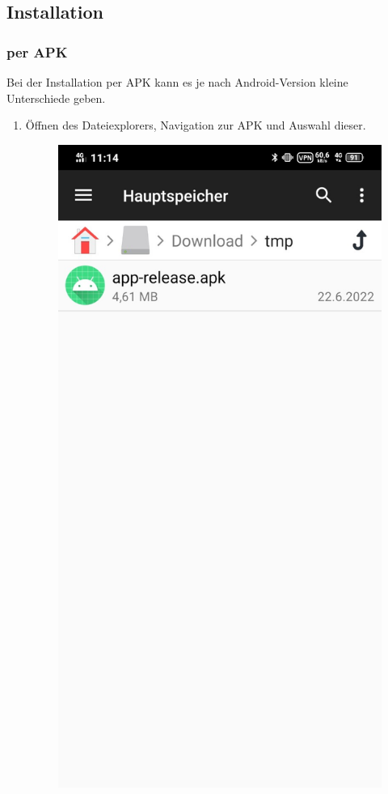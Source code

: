 \documentclass{article}
\begin{document}
\subsection{Installation}
\subsubsection{per APK}
Bei der Installation per APK kann es je nach Android-Version kleine Unterschiede geben.
\begin{enumerate}
    \item Öffnen des Dateiexplorers, Navigation zur APK und Auswahl dieser.
        \begin{figure}[H]
            \includegraphics[scale=0.2]{14.jpg}

\end{figure}
\end{enumerate}
\end{document}

